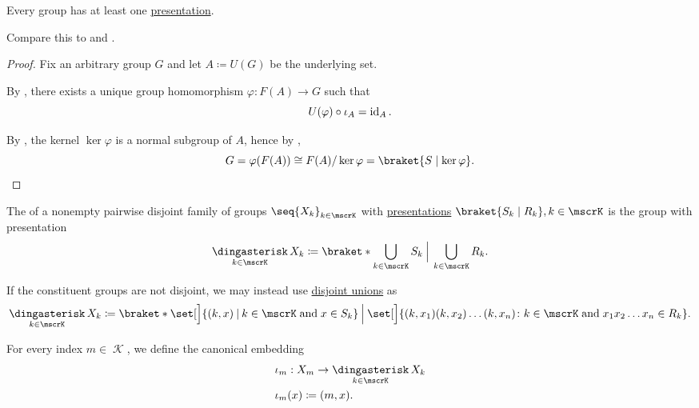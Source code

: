\begin{proposition}\label{thm:group_presentation_existence}
  Every group has at least one \hyperref[def:group_presentation]{presentation}.

  Compare this to  and .
\end{proposition}
\begin{proof}
  Fix an arbitrary group \( G \) and let \( A \coloneqq U(G) \) be the underlying set.

  By , there exists a unique group homomorphism \( \varphi: F(A) \to G \) such that
  \begin{equation*}
    U(\varphi) \bincirc \iota_A = \id_A.
  \end{equation*}

  By , the kernel \( \ker \varphi \) is a normal subgroup of \( A \), hence by ,
  \begin{equation*}
    G = \varphi(F(A)) \cong F(A) / \ker \varphi = \braket{ S \mid \ker \varphi }.
  \end{equation*}
\end{proof}

\begin{definition}\label{def:group_free_product}
  The  of a nonempty pairwise disjoint family of groups \( \seq{ X_k }_{k \in \mscrK} \) with \hyperref[def:group_presentation]{presentations} \( \braket{S_k \mid R_k}, k \in \mscrK \) is the group with presentation
  \begin{equation*}
    \Ast_{k \in \mscrK} X_k \coloneqq \braket*{ \bigcup_{k \in \mscrK} S_k \given[\Big] \bigcup_{k \in \mscrK} R_k }.
  \end{equation*}

  If the constituent groups are not disjoint, we may instead use \hyperref[def:disjoint_union]{disjoint unions} as
  \small
  \begin{equation*}
    \Ast_{k \in \mscrK} X_k \coloneqq \braket*{ \set[\Big]{ (k, x) \given k \in \mscrK \T{and} x \in S_k } \given[\Big] \set[\Big]{ (k, x_1) (k, x_2) \ldots (k, x_n) \colon k \in \mscrK \T{and} x_1 x_2 \ldots x_n \in R_k } }.
  \end{equation*}
  \normalsize

  For every index \( m \in \mscrK \), we define the canonical embedding
  \begin{equation*}
    \begin{aligned}
       &\iota_m: X_m \to \Ast_{k \in \mscrK} X_k \\
       &\iota_m(x) \coloneqq (m, x).
    \end{aligned}
  \end{equation*}
\end{definition}

